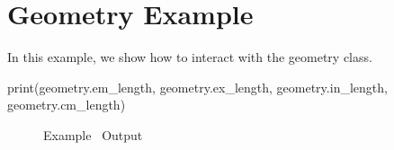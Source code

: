 \documentclass[12pt, titlepage]{article}
\begin{document}
\section{Geometry Example}

In this example, we show how to interact with the geometry class.

\begin{pyblock}

print(geometry.em_length, geometry.ex_length, geometry.in_length, geometry.cm_length)

\end{pyblock}

\begin{figure}[h!]
    \begin{center}
        \ttfamily\printpythontex
    \end{center}
\caption{Example \thesection\ Output}
\end{figure}
\end{document}
